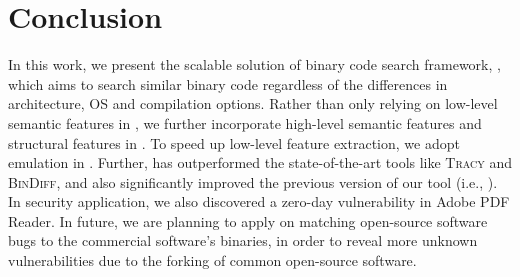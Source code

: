 \section{Conclusion} \label{sec:concl}

In this work, we present the scalable solution of binary code search framework, \toolNew, which aims to search similar binary code regardless of the differences in architecture, OS and compilation options. Rather than only relying on low-level semantic features in \tool, we further incorporate high-level semantic features and structural features in \toolNew. To speed up low-level feature extraction, we adopt emulation in \toolNew. %
Further, \toolNew has outperformed the state-of-the-art tools like \textsc{\small Tracy} and \textsc{\small BinDiff}, and also significantly improved the previous version of our tool (i.e., \tool). In security application, we also discovered a zero-day vulnerability in Adobe PDF Reader. In future, we are planning to apply \toolNew on matching open-source software bugs to the commercial software's binaries, in order to reveal more unknown vulnerabilities due to the  forking of common open-source software.

